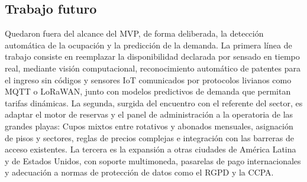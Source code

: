 \documentclass[conference,a4paper]{IEEEtran}
\begin{document}
\subsection{Trabajo futuro}

Quedaron fuera del alcance del MVP, de forma deliberada, la detección automática de la ocupación y la predicción de la demanda. La primera línea de trabajo consiste en reemplazar la disponibilidad declarada por sensado en tiempo real, mediante visión computacional, reconocimiento automático de patentes para el ingreso sin códigos y sensores IoT comunicados por protocolos livianos como MQTT o LoRaWAN, junto con modelos predictivos de demanda que permitan tarifas dinámicas. La segunda, surgida del encuentro con el referente del sector, es adaptar el motor de reservas y el panel de administración a la operatoria de las grandes playas: Cupos mixtos entre rotativos y abonados mensuales, asignación de pisos y sectores, reglas de precios complejas e integración con las barreras de acceso existentes. La tercera es la expansión a otras ciudades de América Latina y de Estados Unidos, con soporte multimoneda, pasarelas de pago internacionales y adecuación a normas de protección de datos como el RGPD y la CCPA.
\end{document}
